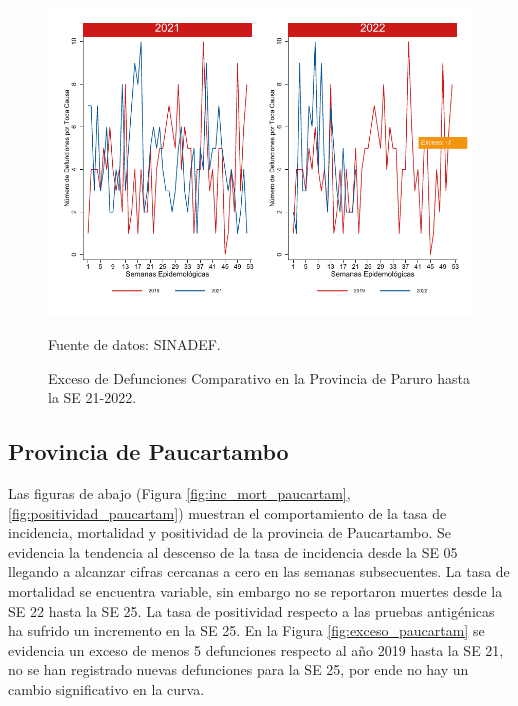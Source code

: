 \documentclass[12pt,a4paper,openany]{book}
\begin{document}
	\begin{figure}[h]
		\caption{Exceso de Defunciones Comparativo en la Provincia de Paruro hasta la SE 21-2022.}\label{fig:exceso_paruro}
		\begin{center}
			\includegraphics[width=0.7\linewidth]{../figuras/exceso_10.pdf}
		\end{center}
		{\footnotesize {Fuente de datos: SINADEF.}}
	\end{figure}
	
	
	\clearpage
	
	\subsection*{Provincia de Paucartambo}
	\noindent Las figuras de abajo (Figura \ref{fig:inc_mort_paucartam}, \ref{fig:positividad_paucartam}) muestran el comportamiento de la tasa de incidencia, mortalidad y positividad de la provincia de Paucartambo. Se evidencia la tendencia al descenso de la tasa de incidencia desde la SE 05 llegando a alcanzar cifras cercanas a cero en las semanas subsecuentes. La tasa de mortalidad se encuentra variable, sin embargo no se reportaron muertes desde la SE 22 hasta la SE 25. La tasa de positividad respecto a las pruebas antigénicas ha sufrido un incremento en la SE 25. 
	En la Figura \ref{fig:exceso_paucartam} se evidencia un exceso de menos 5 defunciones respecto al año 2019 hasta la SE 21, no se han registrado nuevas defunciones para la SE 25, por ende no hay un cambio significativo en la curva.
	
\end{document}
